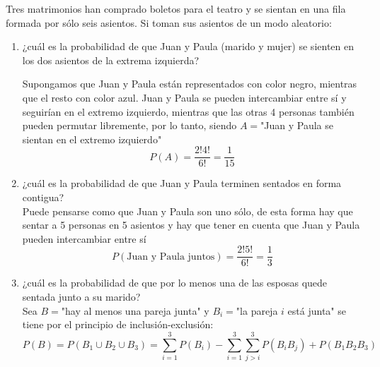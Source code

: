 \item Tres matrimonios han comprado boletos para el teatro y se sientan en una fila formada por sólo seis asientos. Si toman sus asientos de un modo aleatorio:
    \begin{enumerate}
        \item ¿cuál es la probabilidad de que Juan y Paula (marido y mujer) se sienten en los dos asientos de la extrema izquierda?
            \begin{center}
            \end{center}
            Supongamos que Juan y Paula están representados con color negro, mientras que el resto con color azul. Juan y Paula se pueden intercambiar entre sí y seguirían en el extremo izquierdo, mientras que las otras 4 personas también pueden permutar libremente, por lo tanto, siendo $A=$"Juan y Paula se sientan en el extremo izquierdo"\[P(A)=\frac{2!4!}{6!}=\frac{1}{15}\]
        \item ¿cuál es la probabilidad de que Juan y Paula terminen sentados en forma contigua?\e\\
            Puede pensarse como que Juan y Paula son uno sólo, de esta forma hay que sentar a 5 personas en 5 asientos y hay que tener en cuenta que Juan y Paula pueden intercambiar entre sí\[P(\text{Juan y Paula juntos})=\frac{2!5!}{6!}=\frac{1}{3}\]
        \item ¿cuál es la probabilidad de que por lo menos una de las esposas quede sentada junto a su marido?\e\\
            Sea $B=$"hay al menos una pareja junta" y $B_i=$"la pareja $i$ está junta" se tiene por el principio de inclusión-exclusión:\[P(B)=P(B_1\cup B_2\cup B_3)=\sum\limits_{i=1}^3P(B_i)-\sum\limits_{i=1}^3\sum\limits_{j>i}^3P(B_iB_j)+P(B_1B_2B_3)\]

\end{enumerate}
